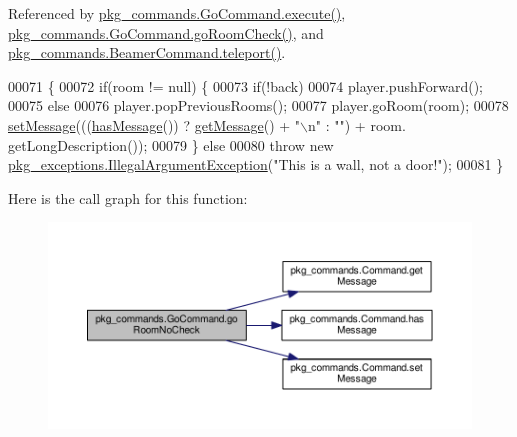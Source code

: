 Referenced by \hyperlink{GoCommand_8java_source_l00032}{pkg\-\_\-commands.\-Go\-Command.\-execute()}, \hyperlink{GoCommand_8java_source_l00056}{pkg\-\_\-commands.\-Go\-Command.\-go\-Room\-Check()}, and \hyperlink{BeamerCommand_8java_source_l00050}{pkg\-\_\-commands.\-Beamer\-Command.\-teleport()}.


\begin{DoxyCode}
00071                                                                                                            
                   \{
00072         \textcolor{keywordflow}{if}(room != null) \{
00073             \textcolor{keywordflow}{if}(!back)
00074                 player.pushForward();
00075             \textcolor{keywordflow}{else}
00076                 player.popPreviousRooms();
00077             player.goRoom(room);
00078             \hyperlink{classpkg__commands_1_1Command_ae210ff216fe908b111ba1c988a963d13}{setMessage}(((\hyperlink{classpkg__commands_1_1Command_ae46bb048d0fa705a5037a5204b530da2}{hasMessage}()) ? \hyperlink{classpkg__commands_1_1Command_ac2a42e2bab264821892daefaf9a18b6c}{getMessage}() + \textcolor{stringliteral}{"\(\backslash\)n"} : \textcolor{stringliteral}{""}) + room.
      getLongDescription());
00079         \} \textcolor{keywordflow}{else}
00080             \textcolor{keywordflow}{throw} \textcolor{keyword}{new} \hyperlink{classpkg__exceptions_1_1IllegalArgumentException}{pkg\_exceptions.IllegalArgumentException}(\textcolor{stringliteral}{"This
       is a wall, not a door!"});
00081     \}
\end{DoxyCode}


Here is the call graph for this function\-:\nopagebreak
\begin{figure}[H]
\begin{center}
\leavevmode
\includegraphics[width=350pt]{classpkg__commands_1_1GoCommand_a210afbc5f3ef34d3ad5759d853c8f8c2_cgraph}
\end{center}
\end{figure}




